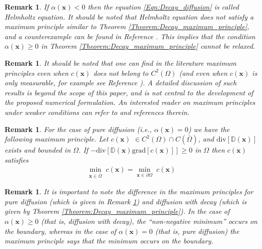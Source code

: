 \documentclass[11pt]{amsart}
\newtheorem{remark}[theorem]{Remark}
\begin{document}
\begin{remark}
  If $\alpha(\mathbf{x}) < 0$ then the equation \eqref{Eqn:Decay_diffusion} is called 
  Helmholtz equation. It should be noted that Helmholtz equation does not satisfy a 
  maximum principle similar to Theorem \ref{Theorem:Decay_maximum_principle}, and a 
  counterexample can be found in Reference \cite{Protter_Weinberger}. This implies 
  that the condition $\alpha(\mathbf{x}) \geq 0$ in Theorem \ref{Theorem:Decay_maximum_principle} 
  cannot be relaxed. 
\end{remark}
\begin{remark}
  It should be noted that one can find in the literature maximum principles even when 
  $c(\mathbf{x})$ does not belong to $C^{2}(\Omega)$ (and even when $c(\mathbf{x})$ 
  is only measurable, for example see Reference \cite{Trudinger_MathZ_1977_v156_p291}). 
  A detailed discussion of such results is beyond the scope of this paper, and is not central 
  to the development of the proposed numerical formulation. An interested reader on maximum 
  principles under weaker conditions can refer to \cite{Pucci_Serrin,Protter_Weinberger,
  Gilbarg_Trudinger,Fraenkel_maximum_principles} and references therein.
\end{remark}
\begin{remark}
  \label{Remark:Decay_pure_diffusion}
  For the case of pure diffusion (i.e., $\alpha(\mathbf{x}) = 0$) we have the following 
  maximum principle. Let $c(\mathbf{x})$ $\in C^{2}(\Omega) \cap C(\bar{\Omega})$, and 
  $\mathrm{div}[\mathbb{D}(\mathbf{x})]$ exists and bounded in $\Omega$. If $-\mathrm{div}
  [\mathbb{D}(\mathbf{x}) \mathrm{grad}[c(\mathbf{x})]] \geq 0$ in $\Omega$ then $c(\mathbf{x})$ 
  satisfies 
\begin{align}
    \mathop{\mathrm{min}}_{\mathbf{x} \in \bar{\Omega}} \; c(\mathbf{x}) =
    \mathop{\mathrm{min}}_{\mathbf{x} \in \partial \Omega} \; c(\mathbf{x})
  \end{align}
\end{remark}

\begin{remark}
  It is important to note the difference in the maximum principles for pure diffusion 
  (which is given in Remark \ref{Remark:Decay_pure_diffusion}) and diffusion with decay 
  (which is given by Theorem \ref{Theorem:Decay_maximum_principle}). In the case of 
  $\alpha(\mathbf{x}) \geq 0$ (that is, diffusion with decay), the ``\emph{non-negative 
    minimum}'' occurs on the boundary, whereas in the case of $\alpha(\mathbf{x}) = 0$ 
  (that is, pure diffusion) the maximum principle says that the minimum occurs on the 
  boundary. 
\end{remark}
\end{document}

